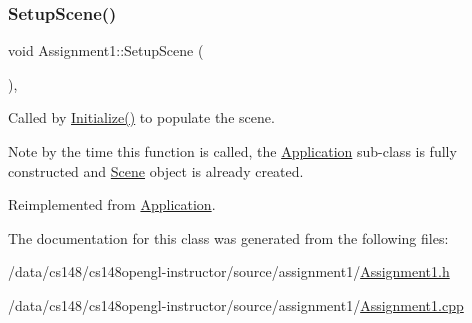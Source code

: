 \hypertarget{class_assignment1_a8d12cf21f1463caa5a8da45110b50103}{}\label{class_assignment1_a8d12cf21f1463caa5a8da45110b50103} 
\subsubsection{\texorpdfstring{Setup\+Scene()}{SetupScene()}}
{\footnotesize\ttfamily void Assignment1\+::\+Setup\+Scene (\begin{DoxyParamCaption}{ }\end{DoxyParamCaption})\hspace{0.3cm}{\ttfamily [private]}, {\ttfamily [virtual]}}



Called by \hyperlink{class_application_a17cf1ea4552d26a1c20f7d98d793d41d}{Initialize()} to populate the scene. 

Note by the time this function is called, the \hyperlink{class_application}{Application} sub-\/class is fully constructed and \hyperlink{class_scene}{Scene} object is already created. 

Reimplemented from \hyperlink{class_application_aa8e8017ef8dd86293c96d0645e66d440}{Application}.



The documentation for this class was generated from the following files\+:\begin{DoxyCompactItemize}
\item 
/data/cs148/cs148opengl-\/instructor/source/assignment1/\hyperlink{_assignment1_8h}{Assignment1.\+h}\item 
/data/cs148/cs148opengl-\/instructor/source/assignment1/\hyperlink{_assignment1_8cpp}{Assignment1.\+cpp}\end{DoxyCompactItemize}
